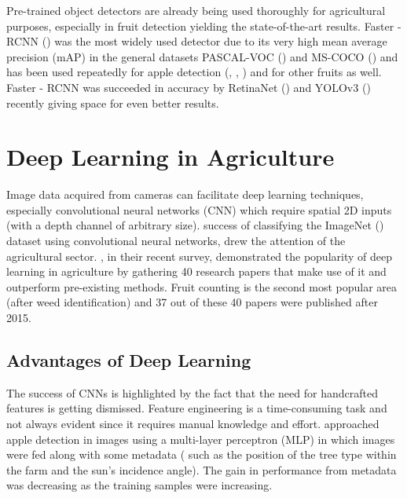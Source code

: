 Pre-trained object detectors are already being used thoroughly for agricultural purposes, especially in fruit detection yielding the state-of-the-art results. Faster - RCNN (\cite{ren2015faster}) was the most widely used detector due to its very high mean average precision (mAP) in the general datasets PASCAL-VOC (\cite{everingham2010pascal}) and MS-COCO (\cite{lin2014microsoft}) and has been used repeatedly for apple detection (\cite{sa2016deepfruits}, \cite{bargoti2017deep}, \cite{tao2018rapid}) and for other fruits as well. Faster - RCNN was succeeded in accuracy by RetinaNet (\cite{lin2017focal}) and YOLOv3 (\cite{redmon2018yolov3}) recently giving space for even better results.

\section{Deep Learning in Agriculture}
Image data acquired from cameras can facilitate deep learning techniques, especially convolutional neural networks (CNN) which require spatial 2D inputs (with a depth channel of arbitrary size). \cite{krizhevsky2012imagenet} success of classifying the ImageNet (\cite{deng2009imagenet}) dataset using convolutional neural networks, drew the attention of the agricultural sector. \cite{kamilaris2018deep}, in their recent survey, demonstrated the popularity of deep learning in agriculture by gathering 40 research papers that make use of it and outperform pre-existing methods. Fruit counting is the second most popular area (after weed identification) and 37 out of these 40 papers were published after 2015. 

\subsection{Advantages of Deep Learning}
The success of CNNs is highlighted by the fact that the need for handcrafted features is getting dismissed. Feature engineering is a time-consuming task and not always evident since it requires manual knowledge and effort. \cite{bargoti2016image} approached apple detection in images using a multi-layer perceptron (MLP) in which images were fed along with some metadata ( such as the position of the tree type within the farm and the sun's incidence angle). The gain in performance from metadata was decreasing as the training samples were increasing. 

